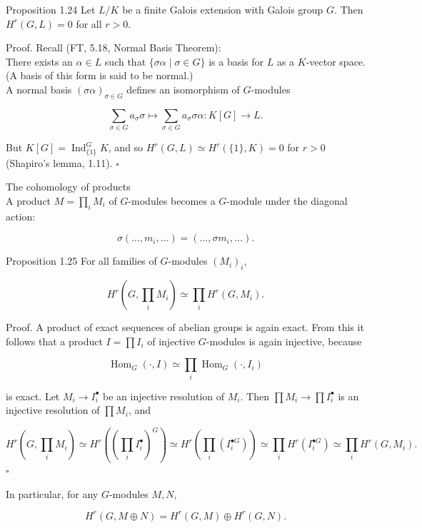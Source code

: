 \documentclass[10pt]{article}
\begin{document}
Proposition 1.24 Let $L / K$ be a finite Galois extension with Galois group $G$. Then $H^{r}(G, L)=0$ for all $r>0$.

Proof. Recall (FT, 5.18, Normal Basis Theorem):\\
There exists an $\alpha \in L$ such that $\{\sigma \alpha \mid \sigma \in G\}$ is a basis for $L$ as a $K$-vector space. (A basis of this form is said to be normal.)\\
A normal basis $(\sigma \alpha)_{\sigma \in G}$ defines an isomorphism of $G$-modules

$$
\sum_{\sigma \in G} a_{\sigma} \sigma \mapsto \sum_{\sigma \in G} a_{\sigma} \sigma \alpha: K[G] \rightarrow L .
$$

But $K[G]=\operatorname{Ind}_{\{1\}}^{G} K$, and so $H^{r}(G, L) \simeq H^{r}(\{1\}, K)=0$ for $r>0$ (Shapiro's lemma, 1.11). \(\square\)

The cohomology of products\\
A product $M=\prod_{i} M_{i}$ of $G$-modules becomes a $G$-module under the diagonal action:

$$
\sigma\left(\ldots, m_{i}, \ldots\right)=\left(\ldots, \sigma m_{i}, \ldots\right) .
$$

Proposition 1.25 For all families of $G$-modules $\left(M_{i}\right)_{i}$,

$$
H^{r}\left(G, \prod_{i} M_{i}\right) \simeq \prod_{i} H^{r}\left(G, M_{i}\right) .
$$

Proof. A product of exact sequences of abelian groups is again exact. From this it follows that a product $I=\prod I_{i}$ of injective $G$-modules is again injective, because

$$
\operatorname{Hom}_{G}(\cdot, I) \simeq \prod_{i} \operatorname{Hom}_{G}\left(\cdot, I_{i}\right)
$$

is exact. Let $M_{i} \rightarrow I_{i}^{\bullet}$ be an injective resolution of $M_{i}$. Then $\prod M_{i} \rightarrow \prod I_{i}^{\bullet}$ is an injective resolution of $\prod M_{i}$, and

$$
H^{r}\left(G, \prod_{i} M_{i}\right) \simeq H^{r}\left(\left(\prod_{i} I_{i}^{\bullet}\right)^{G}\right) \simeq H^{r}\left(\prod_{i}\left(I_{i}^{\bullet G}\right)\right) \simeq \prod_{i} H^{r}\left(I_{i}^{\bullet G}\right) \simeq \prod_{i} H^{r}\left(G, M_{i}\right) .
$$ \(\square\)

In particular, for any $G$-modules $M, N$,

$$
H^{r}(G, M \oplus N)=H^{r}(G, M) \oplus H^{r}(G, N) .
$$
\end{document}
